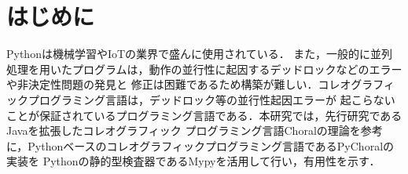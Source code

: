 \documentclass{thesis}
\begin{document}

\maketitle %
\frontmatter\tableofcontents\mainmatter %

\chapter{はじめに}
Pythonは機械学習やIoTの業界で盛んに使用されている．
また，一般的に並列処理を用いたプログラムは，動作の並行性に起因するデッドロックなどのエラーや非決定性問題の発見と
修正は困難であるため構築が難しい．コレオグラフィックプログラミング言語は，デッドロック等の並行性起因エラーが
起こらないことが保証されているプログラミング言語である．本研究では，先行研究であるJavaを拡張したコレオグラフィック
プログラミング言語Choralの理論を参考に，Pythonベースのコレオグラフィックプログラミング言語であるPyChoralの実装を
Pythonの静的型検査器であるMypyを活用して行い，有用性を示す．
\end{document}
